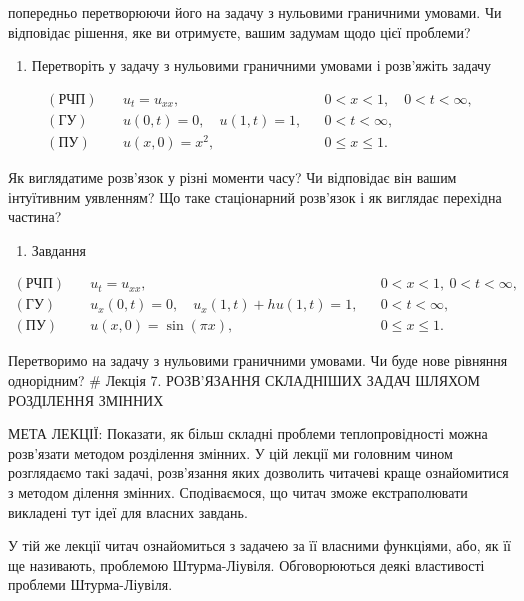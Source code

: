 \documentclass[
  ukrainian,
]{article}
\providecommand{\tightlist}{%
  \setlength{\itemsep}{0pt}\setlength{\parskip}{0pt}}
\begin{document}
попередньо перетворюючи його на задачу з нульовими граничними умовами.
Чи відповідає рішення, яке ви отримуєте, вашим задумам щодо цієї
проблеми?

\begin{enumerate}
\def\labelenumi{\arabic{enumi}.}
\setcounter{enumi}{1}
\tightlist
\item
  Перетворіть у задачу з нульовими граничними умовами і розв'яжіть
  задачу
\end{enumerate}

\[
\begin{aligned}
(\text{РЧП})\quad & u_t = u_{xx}, && 0 < x < 1,\quad 0 < t < \infty, \\
(\text{ГУ})\quad & u(0,t)=0,\quad u(1,t)=1, && 0 < t < \infty, \\
(\text{ПУ})\quad & u(x,0)=x^2, && 0 \le x \le 1.
\end{aligned}
\]

Як виглядатиме розв'язок у різні моменти часу? Чи відповідає він вашим
інтуїтивним уявленням? Що таке стаціонарний розв'язок і як виглядає
перехідна частина?

\begin{enumerate}
\def\labelenumi{\arabic{enumi}.}
\setcounter{enumi}{2}
\tightlist
\item
  Завдання
\end{enumerate}

\[
\begin{aligned}
(\text{РЧП})\quad & u_t = u_{xx}, && 0 < x < 1,\ 0 < t < \infty, \\
(\text{ГУ})\quad & u_x(0,t) = 0,\quad u_x(1,t) + h u(1,t) = 1, && 0 < t < \infty, \\
(\text{ПУ})\quad & u(x,0) = \sin(\pi x), && 0 \leqslant x \leqslant 1.
\end{aligned}
\]

Перетворимо на задачу з нульовими граничними умовами. Чи буде нове
рівняння однорідним? \# Лекція 7. РОЗВ'ЯЗАННЯ СКЛАДНІШИХ ЗАДАЧ ШЛЯХОМ
РОЗДІЛЕННЯ ЗМІННИХ

МЕТА ЛЕКЦІЇ: Показати, як більш складні проблеми теплопровідності можна
розв'язати методом розділення змінних. У цій лекції ми головним чином
розглядаємо такі задачі, розв'язання яких дозволить читачеві краще
ознайомитися з методом ділення змінних. Сподіваємося, що читач зможе
екстраполювати викладені тут ідеї для власних завдань.

У тій же лекції читач ознайомиться з задачею за її власними функціями,
або, як її ще називають, проблемою Штурма-Ліувіля. Обговорюються деякі
властивості проблеми Штурма-Ліувіля.
\end{document}
